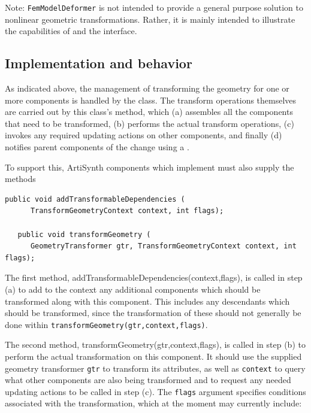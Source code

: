 \begin{sideblock}
Note: {\tt FemModelDeformer} is not intended to provide a general
purpose solution to nonlinear geometric transformations. Rather, it
is mainly intended to illustrate the capabilities of
 and the
 interface.
\end{sideblock}

\subsection{Implementation and behavior}

As indicated above, the management of transforming the geometry for one
or more components is handled by the
 class.
The transform operations themselves are carried out by this class's
method, which (a) assembles all the components that need
to be transformed, (b) performs the actual transform operations,
(c) invokes any required updating actions on other components,
and finally (d) notifies parent components of the change using
a .

To support this, ArtiSynth components which implement
must also supply the methods
\begin{lstlisting}[]
   public void addTransformableDependencies (
      TransformGeometryContext context, int flags);

   public void transformGeometry (
      GeometryTransformer gtr, TransformGeometryContext context, int flags);
\end{lstlisting}
%
The first method,
%
{addTransformableDependencies(context,flags)}, 
is called in step (a) to add to the context any additional components
which should be transformed along with this component. This includes
any descendants which should be transformed, since the
transformation of these should not generally be done within\pdfbreak
{\tt transformGeometry(gtr,context,flags)}.

The second method, 
%
{transformGeometry(gtr,context,flags)}, is
called in step (b) to perform the actual transformation on this
component.  It should use the supplied geometry transformer {\tt gtr}
to transform its attributes, as well as {\tt context} to query what
other components are also being transformed and to request
any needed updating actions to be called in step (c).  The {\tt flags} argument
specifies conditions associated with the transformation, which at the
moment may currently include:

